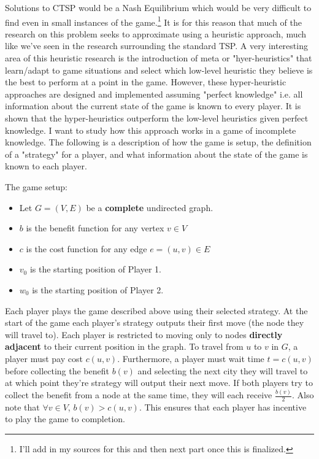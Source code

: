 \documentclass[12pt]{article}%
\begin{document}
	Solutions to CTSP would be a Nash Equilibrium which would be very difficult to find even in small instances of the game.\footnote{I'll add in my sources for this and then next part once this is finalized.} It is for this reason that much of the research on this problem seeks to approximate using a heuristic approach, much like we've seen in the research surrounding the standard TSP. A very interesting area of this heuristic research is the introduction of meta or "hyer-heuristics" that learn/adapt to game situations and select which low-level heuristic they believe is the best to perform at a point in the game. However, these hyper-heuristic approaches are designed and implemented assuming "perfect knowledge" i.e. all information about the current state of the game is known to every player. It is shown that the hyper-heuristics outperform the low-level heuristics given perfect knowledge. I want to study how this approach works in a game of incomplete knowledge. The following is a description of how the game is setup, the definition of a "strategy" for a player, and what information about the state of the game is known to each player.\newpage
	
	The game setup:\newline
	
	\begin{itemize}
		\item Let $G = (V, E)$ be a \textbf{complete} undirected graph.
		\item $b$ is the benefit function for any vertex $v \in V$
		\item $c$ is the cost function for any edge $e = (u,v) \in E$
		\item $v_{0}$ is the starting position of Player 1.
		\item $w_{0}$ is the starting position of Player 2.
	\end{itemize}

	Each player plays the game described above using their selected strategy. At the start of the game each player's strategy outputs their first move (the node they will travel to). Each player is restricted to moving only to nodes \textbf{directly adjacent} to their current position in the graph. To travel from $u$ to $v$ in $G$, a player must pay cost $c(u,v)$. Furthermore, a player must wait time $t = c(u,v)$ before collecting the benefit $b(v)$ and selecting the next city they will travel to at which point they're strategy will output their next move. If both players try to collect the benefit from a node at the same time, they will each receive $\frac{b(v)}{2}$. Also note that $\forall v \in V$, $b(v) > c(u,v)$. This ensures that each player has incentive to play the game to completion.\par
	
\end{document}
